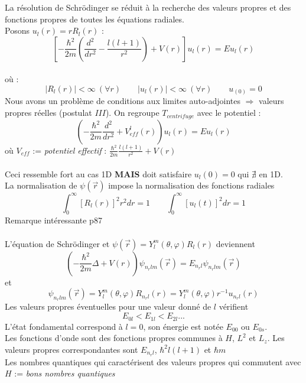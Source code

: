 \documentclass	[11pt, a4paper, openany]{book}
\begin{document}
	La résolution de Schrödinger se réduit à la recherche des valeurs propres et des fonctions propres de toutes les équations radiales.\\
	Posons $u_l(r)=rR_l(r)$ : \begin{equation}
	\left[-\frac{\hbar^2}{2m}\left(\frac{d^2}{dr^2}-\frac{l(l+1)}{r^2}\right)+V(r)\right]u_l(r)=Eu_l(r)
	\end{equation}
	\ \\
	où : 
	\begin{equation}
		|R_l(r)|<\infty\ (\forall r)\qquad
		|u_l(r)|<\infty\ (\forall r)\qquad
		u_(0)=0
	\end{equation}
	Nous avons un problème de conditions aux limites auto-adjointes $\Rightarrow$ valeurs propres réelles (postulat $III$). On regroupe $T_{centrifuge}$ avec le potentiel : \begin{equation}\label{eq:6.14}
	\left(-\frac{\hbar^2}{2m}\frac{d^2}{dr^2}+V^l_{eff}(r)\right)u_l(r)=Eu_l(r)
	\end{equation}
	où $V_{eff}$ := \textit{potentiel effectif} : $\frac{\hbar^2}{2m}\frac{l(l+1)}{r^2}+V(r)$\\\\
	Ceci ressemble fort au cas 1D \textbf{MAIS} doit satisfaire $u_l(0)=0$ qui $\nexists$ en 1D.\\
	La normalisation de $\psi(\vec r)$ impose la normalisation des fonctions radiales $$\int_0^{\infty}[R_l(r)]^2r^2dr=1\qquad\int_0^{\infty}[u_l(t)]^2dr=1$$Remarque intéressante p87\\\\
	L'équation de Schrödinger et $\psi(\vec r)=Y^m_l(\theta,\varphi)R_l(r)$ deviennent \begin{equation}
	\left(-\frac{\hbar^2}{2m}\Delta+V(r)\right)\psi_{n_rlm}(\vec r)=E_{n_rl}\psi_{n_rlm}(\vec r)
	\end{equation}
	et
	\begin{equation}
		\psi_{n_rlm}(\vec r)=Y^m_l(\theta,\varphi)R_{n_rl}(r)=Y_l^m(\theta,\varphi)r^{-1}u_{n_rl}(r)
	\end{equation}
	Les valeurs propres éventuelles pour une valeur donné de $l$ vérifient \begin{equation}
	E_{0l}<E_{1l}<E_{2l}...
	\end{equation}
	L'état fondamental correspond à $l=0$, son énergie est notée $E_{00}$ ou $E_{0s}$.\\
	
	Les fonctions d'onde sont des fonctions propres communes à $H$, $L^2$ et $L_z$. Les valeurs propres correspondantes sont $E_{n_rl}$, $\hbar^2l(l+1)$ et $\hbar m$\\
	Les nombres quantiques qui caractérisent des valeurs propres qui commutent avec $H$ := \textit{bons nombres quantiques}
\end{document}
